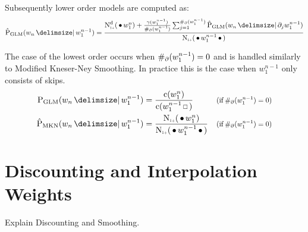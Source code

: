 Subsequently lower order models are computed as:
\begin{equation}
  \label{eq:glm-low}
  \ProbGLM*{w_n}{w_1^{n-1}} =
    \frac{\DiscountedCount*(\WSkp w_1^n) + \frac{\gamma(w_1^{n-1})}{\NumSkpOp(w_1^{n-1})}
                                     \sum_{j=1}^{\NumSkpOp(w_1^{n-1})} \ProbGLM*{w_n}{\SkpOp_j w_1^{n-1}}}
         {\ContCountIp(\WSkp w_1^{n-1} \WSkp)}
\end{equation}


The case of the lowest order occurs when $\#_\partial(w_1^{n-1}) = 0$ and is
handled similarly to Modified Kneser-Ney Smoothing.
In practice this is the case when $w_1^{n-1}$ only consists of skips.
\begin{subequations}
  \label{eq:glm-lowest}
  \begin{align}
    \ProbGLM {w_n}{w_1^{n-1}} &= \frac{\Count(w_1^n)}{\Count(w_1^{n-1} \Skp)}
      & \Condition{\NumSkpOp(w_1^{n-1}) = 0} \\
    \ProbMKN*{w_n}{w_1^{n-1}} &= \frac{\ContCountIp(\WSkp w_1^n)}{\ContCountIp(\WSkp w_1^{n-1} \WSkp)}
      & \Condition{\NumSkpOp(w_1^{n-1}) = 0}
  \end{align}
\end{subequations}

\section{Discounting and Interpolation Weights}
\label{sec:discounts-interpolation-weights}

\begin{draft}
Explain Discounting and Smoothing.
\end{draft}

